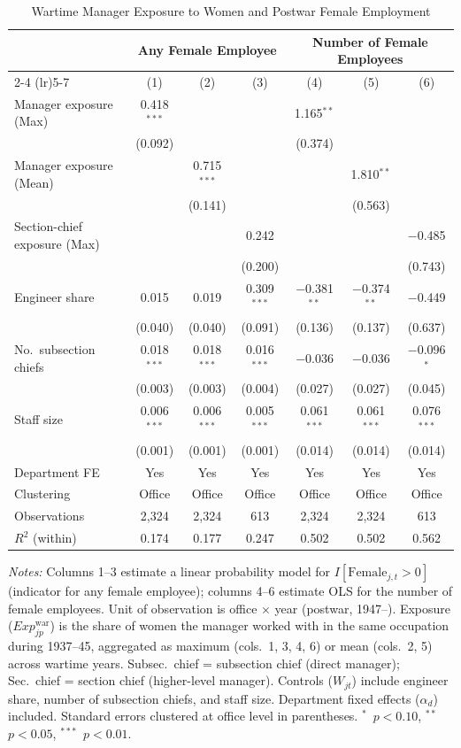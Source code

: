 \documentclass[11pt]{article}
\begin{document}
\begin{table}[htbp]
\centering
\begin{threeparttable}
\caption{Wartime Manager Exposure to Women and Postwar Female Employment}
\label{tab:exposure-manager}
\small
\begin{tabular}{l*{6}{c}}
\toprule
 & \multicolumn{3}{c}{Any Female Employee} & \multicolumn{3}{c}{Number of Female Employees} \\
\cmidrule(lr){2-4} \cmidrule(lr){5-7}
 & (1) & (2) & (3) & (4) & (5) & (6) \\
\midrule
Manager exposure (Max) & 0.418$^{***}$ & & & 1.165$^{**}$ & & \\
 & (0.092) & & & (0.374) & & \\[4pt]
Manager exposure (Mean) & & 0.715$^{***}$ & & & 1.810$^{**}$ & \\
 & & (0.141) & & & (0.563) & \\[4pt]
Section-chief exposure (Max) & & & 0.242 & & & $-$0.485 \\
 & & & (0.200) & & & (0.743) \\[4pt]
Engineer share & 0.015 & 0.019 & 0.309$^{***}$ & $-$0.381$^{**}$ & $-$0.374$^{**}$ & $-$0.449 \\
 & (0.040) & (0.040) & (0.091) & (0.136) & (0.137) & (0.637) \\[4pt]
No.\ subsection chiefs & 0.018$^{***}$ & 0.018$^{***}$ & 0.016$^{***}$ & $-$0.036 & $-$0.036 & $-$0.096$^{*}$ \\
 & (0.003) & (0.003) & (0.004) & (0.027) & (0.027) & (0.045) \\[4pt]
Staff size & 0.006$^{***}$ & 0.006$^{***}$ & 0.005$^{***}$ & 0.061$^{***}$ & 0.061$^{***}$ & 0.076$^{***}$ \\
 & (0.001) & (0.001) & (0.001) & (0.014) & (0.014) & (0.014) \\
\midrule
Department FE & Yes & Yes & Yes & Yes & Yes & Yes \\
Clustering & Office & Office & Office & Office & Office & Office \\
Observations & 2,324 & 2,324 & 613 & 2,324 & 2,324 & 613 \\
$R^2$ (within) & 0.174 & 0.177 & 0.247 & 0.502 & 0.502 & 0.562 \\
\bottomrule
\end{tabular}
\begin{tablenotes}[flushleft]
\footnotesize
\item \textit{Notes:} Columns 1--3 estimate a linear probability model for $I[\mathrm{Female}_{j,t} > 0]$ (indicator for any female employee); columns 4--6 estimate OLS for the number of female employees. Unit of observation is office $\times$ year (postwar, 1947--). Exposure ($Exp^{\text{war}}_{jp}$) is the share of women the manager worked with in the same occupation during 1937--45, aggregated as maximum (cols.\ 1, 3, 4, 6) or mean (cols.\ 2, 5) across wartime years. Subsec.\ chief = subsection chief (direct manager); Sec.\ chief = section chief (higher-level manager). Controls ($W_{jt}$) include engineer share, number of subsection chiefs, and staff size. Department fixed effects ($\alpha_d$) included. Standard errors clustered at office level in parentheses. $^{*}$~$p<0.10$, $^{**}$~$p<0.05$, $^{***}$~$p<0.01$.

\end{tablenotes}
\end{threeparttable}
\end{table}
\end{document}

